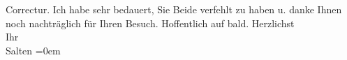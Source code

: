 \begin{ledgroupsized}[t]{13cm}
               Correctur.\pend
           \pstart
           Ich habe sehr bedauert, Sie Beide\label{K_L03407-5v}\label{K_L03407-5h} verfehlt zu haben u. danke Ihnen noch nachträglich für Ihren Besuch.
               Hoffentlich auf bald.\pend
           \pstart
           Herzlichst {\\[\baselineskip]}Ihr {\\[\baselineskip]}\spacefill\mbox{Salten}\pend
           \leftskip=0em{}
         
         \endnumbering{}\end{ledgroupsized}  \newcommand{\dateiname}{L03407}\newcommand{\titel}{Felix Salten an Arthur Schnitzler, 11. 4. 1905}\newcommand{\editorInnen}{Martin Anton Müller und Laura Untner}
      